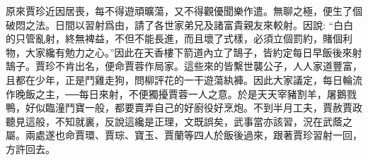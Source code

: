 \begin{parag}
    原來賈珍近因居喪，每不得遊頑曠蕩，又不得觀優聞樂作遣。無聊之極，便生了個破悶之法。日間以習射爲由，請了各世家弟兄及諸富貴親友來較射。因說: “白白的只管亂射，終無裨益，不但不能長進，而且壞了式樣，必須立個罰約，賭個利物，大家纔有勉力之心。”因此在天香樓下箭道內立了鵠子，皆約定每日早飯後來射鵠子。賈珍不肯出名，便命賈蓉作局家。這些來的皆繫世襲公子，人人家道豐富，且都在少年，正是鬥雞走狗，問柳評花的一干遊蕩紈褲。因此大家議定，每日輪流作晚飯之主，──每日來射，不便獨擾賈蓉一人之意。於是天天宰豬割羊，屠鵝戮鴨，好似臨潼鬥寶一般，都要賣弄自己的好廚役好烹炮。不到半月工夫，賈赦賈政聽見這般，不知就裏，反說這纔是正理，文既誤矣，武事當亦該習，況在武蔭之屬。兩處遂也命賈環、賈琮、寶玉、賈蘭等四人於飯後過來，跟著賈珍習射一回，方許回去。
\end{parag}


